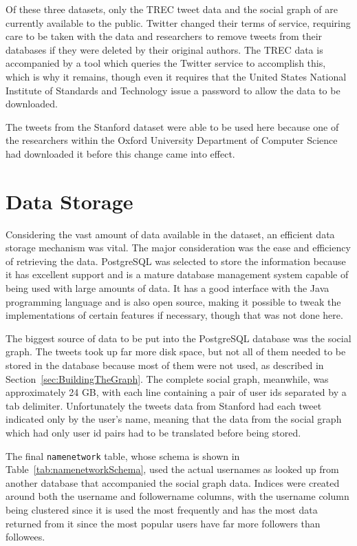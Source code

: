 Of these three datasets, only the TREC tweet data and the social graph of \cite{Kwak2010} are currently available to the public. Twitter changed their terms of service, requiring care to be taken with the data and researchers to remove tweets from their databases if they were deleted by their original authors. The TREC data is accompanied by a tool which queries the Twitter service to accomplish this, which is why it remains, though even it requires that the United States National Institute of Standards and Technology issue a password to allow the data to be downloaded.

The tweets from the Stanford dataset were able to be used here because one of the researchers within the Oxford University Department of Computer Science had downloaded it before this change came into effect.


\section{Data Storage}
\label{sec:DataStorage}

Considering the vast amount of data available in the dataset, an efficient data storage mechanism was vital. The major consideration was the ease and efficiency of retrieving the data. PostgreSQL was selected to store the information because it has excellent support and is a mature database management system capable of being used with large amounts of data. It has a good interface with the Java programming language and is also open source, making it possible to tweak the implementations of certain features if necessary, though that was not done here.

The biggest source of data to be put into the PostgreSQL database was the social graph. The tweets took up far more disk space, but not all of them needed to be stored in the database because most of them were not used, as described in Section~\ref{sec:BuildingTheGraph}. The complete social graph, meanwhile, was approximately 24 GB, with each line containing a pair of user ids separated by a tab delimiter. Unfortunately the tweets data from Stanford had each tweet indicated only by the user's name, meaning that the data from the social graph which had only user id pairs had to be translated before being stored.

The final \texttt{namenetwork} table, whose schema is shown in Table~\ref{tab:namenetworkSchema}, used the actual usernames as looked up from another database that accompanied the social graph data. Indices were created around both the username and followername columns, with the username column being clustered since it is used the most frequently and has the most data returned from it since the most popular users have far more followers than followees.

